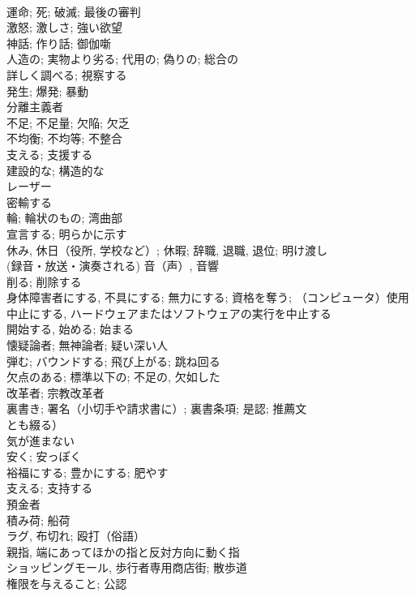 \documentclass[8pt]{extreport}
\begin{document}
\begin{CJK}{UTF8}{min}
\\	運命; 死; 破滅; 最後の審判	
\\	激怒; 激しさ; 強い欲望	
\\	神話; 作り話; 御伽噺	
\\	人造の; 実物より劣る; 代用の; 偽りの; 総合の	
\\	詳しく調べる; 視察する	
\\	発生; 爆発; 暴動	
\\	分離主義者	
\\	不足; 不足量; 欠陥; 欠乏	
\\	不均衡; 不均等; 不整合	
\\	支える; 支援する	
\\	建設的な; 構造的な	
\\	レーザー	
\\	密輸する	
\\	輪; 輪状のもの; 湾曲部	
\\	宣言する; 明らかに示す	
\\	休み, 休日（役所, 学校など）; 休暇; 辞職, 退職, 退位; 明け渡し	
\\	(録音・放送・演奏される) 音（声）, 音響	
\\	削る; 削除する	
\\	身体障害者にする, 不具にする; 無力にする; 資格を奪う; （コンピュータ）使用中止にする, ハードウェアまたはソフトウェアの実行を中止する	
\\	開始する, 始める; 始まる	
\\	懐疑論者; 無神論者; 疑い深い人	
\\	弾む; バウンドする; 飛び上がる; 跳ね回る	
\\	欠点のある; 標準以下の; 不足の, 欠如した	
\\	改革者; 宗教改革者	
\\	裏書き; 署名（小切手や請求書に）; 裏書条項; 是認; 推薦文
\\	とも綴る）	
\\	気が進まない	
\\	安く; 安っぽく	
\\	裕福にする; 豊かにする; 肥やす	
\\	支える; 支持する	
\\	預金者	
\\	積み荷; 船荷	
\\	ラグ, 布切れ; 殴打（俗語）	
\\	親指, 端にあってほかの指と反対方向に動く指	
\\	ショッピングモール, 歩行者専用商店街; 散歩道	
\\	権限を与えること; 公認	

\end{CJK}
\end{document}
